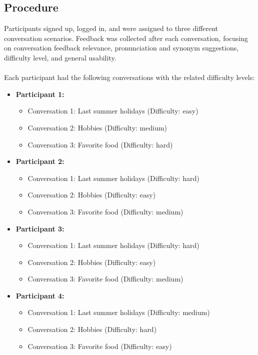 \documentclass{article}
\begin{document}
\subsection{Procedure}
Participants signed up, logged in, and were assigned to three different conversation scenarios. Feedback was collected after each conversation, focusing on conversation feedback relevance, pronunciation and synonym suggestions, difficulty level, and general usability.
\\\\
Each participant had the following conversations with the related difficulty levels:
\begin{itemize}
    \item \textbf{Participant 1:}
    \begin{itemize}
        \item Conversation 1: Last summer holidays (Difficulty: easy)
        \item Conversation 2: Hobbies (Difficulty: medium)
        \item Conversation 3: Favorite food (Difficulty: hard)
    \end{itemize}
    \item \textbf{Participant 2:}
    \begin{itemize}
        \item Conversation 1: Last summer holidays (Difficulty: hard)
        \item Conversation 2: Hobbies (Difficulty: easy)
        \item Conversation 3: Favorite food (Difficulty: medium)
    \end{itemize}
    \item \textbf{Participant 3:}
    \begin{itemize}
        \item Conversation 1: Last summer holidays (Difficulty: hard)
        \item Conversation 2: Hobbies (Difficulty: easy)
        \item Conversation 3: Favorite food (Difficulty: medium)
    \end{itemize}
    \item \textbf{Participant 4:}
    \begin{itemize}
        \item Conversation 1: Last summer holidays (Difficulty: medium)
        \item Conversation 2: Hobbies (Difficulty: hard)
        \item Conversation 3: Favorite food (Difficulty: easy)
    \end{itemize}
\end{itemize}
\end{document}
